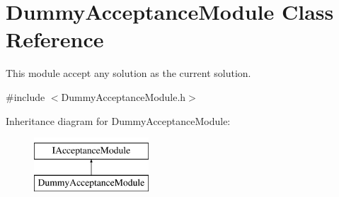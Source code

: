 \hypertarget{classDummyAcceptanceModule}{\section{\-Dummy\-Acceptance\-Module \-Class \-Reference}
\label{classDummyAcceptanceModule}
}


\-This module accept any solution as the current solution.  




{\ttfamily \#include $<$\-Dummy\-Acceptance\-Module.\-h$>$}

\-Inheritance diagram for \-Dummy\-Acceptance\-Module\-:\begin{figure}[H]
\begin{center}
\leavevmode
\includegraphics[height=2.000000cm]{classDummyAcceptanceModule}
\end{center}
\end{figure}
